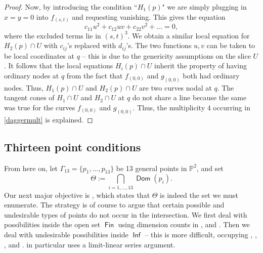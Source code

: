 \documentclass{article}
\renewcommand{\P}{\mathbb{P}}
\DeclareMathOperator{\Dom}{\mathsf{Dom}}
\DeclareMathOperator{\Inf}{\mathsf{Inf}}
\DeclareMathOperator{\Fin}{\mathsf{Fin}}
\DeclareMathOperator{\Inc}{\mathsf{Inc}}
\DeclareMathOperator{\Base}{\mathsf{Base}}
\begin{document}
\begin{proof}
    Now, by introducing the condition ``$H_{1}(p)$" we are simply plugging in $x=y=0$ into $f_{(s,t)}$ and requesting vanishing. This gives the equation $$c_{11}u^2 + c_{12}uv + c_{22}v^2 + \dots = 0,$$ where the excluded terms lie in $(s,t)^{3}$. We obtain a similar local equation for $H_{2}(p) \cap U$ with $c_{ij}$'s replaced with $d_{ij}$'s.  The two functions $u,v$ can be taken to be local coordinates at $q$ -- this is due to the genericity assumptions on the slice $U$. It follows that the local equations $H_{i}(p) \cap U$ inherit the property of having ordinary nodes at $q$ from the fact that $f_{(0,0)}$ and $g_{(0,0)}$ both had ordinary nodes. Thus, $H_{1}(p) \cap U$ and $H_{2}(p)\cap U$ are two curves nodal at $q$.  The tangent cones of $H_{1}\cap U$ and $H_{2} \cap U$ at $q$ do not share a line because the same was true for the curves $f_{(0,0)}$ and $g_{(0,0)}$.  Thus,  the multiplicity $4$ occurring in \eqref{daggermult} is explained.  
\end{proof}









\subsection{Thirteen point conditions}
\label{sec:thirteenpointconditions}

From here on, let $\Gamma_{13} = \{p_{1}, \dots, p_{13}\}$ be 13 general points in
$\P^{2}$, and set \begin{equation}
\label{equation:Theta}\Theta := \bigcap \limits_{i=1, \dots, 13} \Dom(p_i).
\end{equation}
Our next major objective is , which states that $\Theta$ is indeed the set we must enumerate. The strategy is of course to argue that certain possible and undesirable types of points do not occur in the intersection.  We first deal with possibilities inside the open set $\Fin$ using dimension counts in  , and . Then we deal with undesirable possibilities inside $\Inf$ -- this is more difficult, occupying , ,  , and .   in particular uses a limit-linear series argument.
\end{document}
